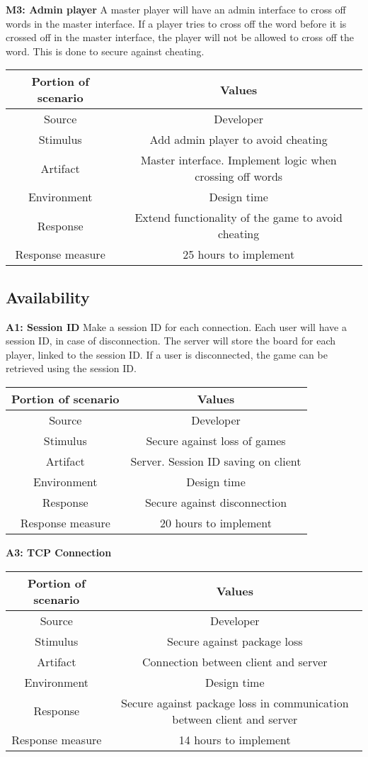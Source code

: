 {\bf M3: Admin player}
A master player will have an admin interface to cross off words in the master interface. If a player tries to cross off the word before it is crossed off in the master interface, the player will not be allowed to cross off the word. This is done to secure against cheating.

\begin{tabular}{|c|c|}
\hline
{\bf Portion of scenario} & {\bf Values} \\ \hline
Source & Developer \\ \hline
Stimulus & Add admin player to avoid cheating \\ \hline
Artifact & Master interface. Implement logic when crossing off words \\ \hline
Environment & Design time \\ \hline
Response & Extend functionality of the game to avoid cheating \\ \hline
Response measure & 25 hours to implement \\ \hline
\end{tabular}



\subsection{Availability}

{\bf A1: Session ID}
Make a session ID for each connection. Each user will have a session ID, in case of disconnection. The server will store the board for each player, linked to the session ID. If a user is disconnected, the game can be retrieved using the session ID.

\begin{tabular}{|c|c|}
\hline
{\bf Portion of scenario} & {\bf Values} \\ \hline
Source &  Developer \\ \hline
Stimulus &  Secure against loss of games \\ \hline
Artifact &  Server. Session ID saving on client \\ \hline
Environment & Design time\\ \hline
Response & Secure against disconnection \\ \hline
Response measure & 20 hours to implement \\ \hline
\end{tabular}


{\bf A3: TCP Connection}
\begin{tabular}{|c|c|}
\hline
{\bf Portion of scenario} & {\bf Values} \\ \hline
Source & Developer \\ \hline
Stimulus & Secure against package loss \\ \hline
Artifact & Connection between client and server \\ \hline
Environment & Design time \\ \hline
Response & Secure against package loss in communication between client and server \\ \hline
Response measure & 14 hours to implement \\ \hline
\end{tabular}

